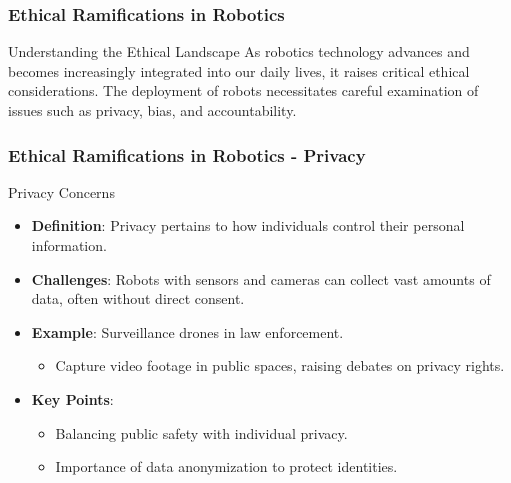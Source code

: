 \documentclass[aspectratio=169]{beamer}
\begin{document}
\begin{frame}[fragile]
    \frametitle{Ethical Ramifications in Robotics}
    \begin{block}{Understanding the Ethical Landscape}
        As robotics technology advances and becomes increasingly integrated into our daily lives, it raises critical ethical considerations. The deployment of robots necessitates careful examination of issues such as privacy, bias, and accountability.
    \end{block}
\end{frame}

\begin{frame}[fragile]
    \frametitle{Ethical Ramifications in Robotics - Privacy}
    \begin{block}{Privacy Concerns}
        \begin{itemize}
            \item \textbf{Definition}: Privacy pertains to how individuals control their personal information.
            \item \textbf{Challenges}: Robots with sensors and cameras can collect vast amounts of data, often without direct consent.
            \item \textbf{Example}: Surveillance drones in law enforcement.
            \begin{itemize}
                \item Capture video footage in public spaces, raising debates on privacy rights.
            \end{itemize}
            \item \textbf{Key Points}:
            \begin{itemize}
                \item Balancing public safety with individual privacy.
                \item Importance of data anonymization to protect identities.
            \end{itemize}
        \end{itemize}
    \end{block}
\end{frame}
\end{document}
